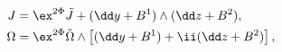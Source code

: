 \begin{equation}
\begin{aligned}
   J &= \ex^{2\Phi}\tilde{J} + (\dd y+B^1) \wedge (\dd z+B^2) , \\
   \Omega &= \ex^{2\Phi}\tilde{\Omega} \wedge 
      \left[(\dd y+B^1)+ \ii(\dd z+B^2) \right] ,
\end{aligned}
\end{equation}

